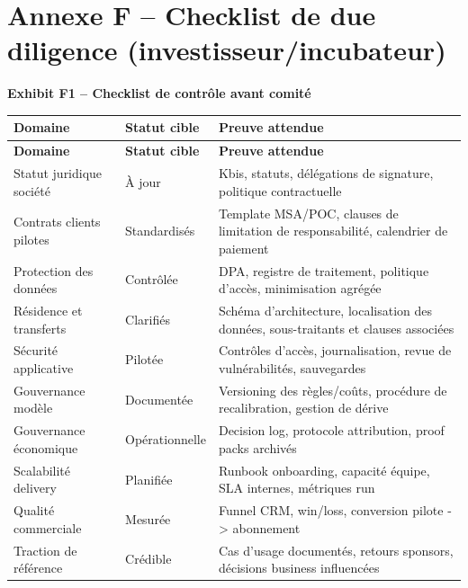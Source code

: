 \documentclass[11pt,a4paper]{article}
\newcommand{\exhibit}[1]{\vspace{2mm}\noindent\colorbox{PraedixaLight}{\parbox{\dimexpr\linewidth-2\fboxsep\relax}{\textbf{#1}}}\vspace{1mm}}
\begin{document}
\section{Annexe F -- Checklist de due diligence (investisseur/incubateur)}
\exhibit{Exhibit F1 -- Checklist de contrôle avant comité}
\small
\begin{longtable}{@{}p{4.4cm}p{2.6cm}p{7.1cm}@{}}
\toprule
\textbf{Domaine} & \textbf{Statut cible} & \textbf{Preuve attendue} \\
\midrule
\endfirsthead
\toprule
\textbf{Domaine} & \textbf{Statut cible} & \textbf{Preuve attendue} \\
\midrule
\endhead
Statut juridique société & À jour & Kbis, statuts, délégations de signature, politique contractuelle \\
Contrats clients pilotes & Standardisés & Template MSA/POC, clauses de limitation de responsabilité, calendrier de paiement \\
Protection des données & Contrôlée & DPA, registre de traitement, politique d'accès, minimisation agrégée \\
Résidence et transferts & Clarifiés & Schéma d'architecture, localisation des données, sous-traitants et clauses associées \\
Sécurité applicative & Pilotée & Contrôles d'accès, journalisation, revue de vulnérabilités, sauvegardes \\
Gouvernance modèle & Documentée & Versioning des règles/coûts, procédure de recalibration, gestion de dérive \\
Gouvernance économique & Opérationnelle & Decision log, protocole attribution, proof packs archivés \\
Scalabilité delivery & Planifiée & Runbook onboarding, capacité équipe, SLA internes, métriques run \\
Qualité commerciale & Mesurée & Funnel CRM, win/loss, conversion pilote -> abonnement \\
Traction de référence & Crédible & Cas d'usage documentés, retours sponsors, décisions business influencées \\
\bottomrule
\end{longtable}
\normalsize
\end{document}
